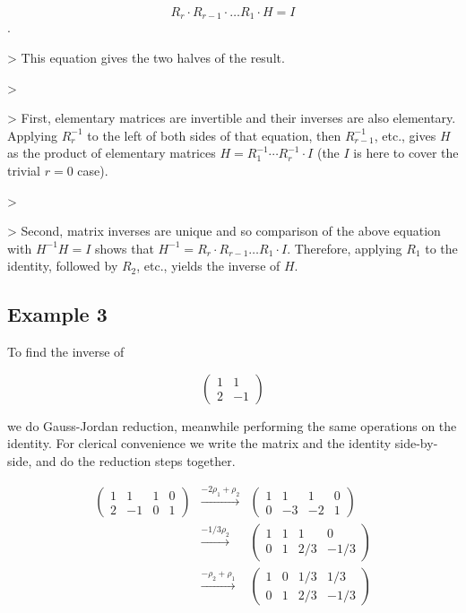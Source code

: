 $$R _{r}\cdot R _{r-1}\cdot\dots R _{1}\cdot H=I$$.



> This equation gives the two halves of the result.

>

> First, elementary matrices are invertible and their inverses are also elementary.
Applying $R _r^{-1}$ to the left of both sides of that equation, then $R _{r-1}^{-1}$,
etc., gives $H$ as the product of elementary matrices $H=R _1^{-1}\cdots R _r^{-1}\cdot I$
(the $I$ is here to cover the trivial $r=0$ case).

>

> Second, matrix inverses are unique and so comparison of the above equation with
$H^{-1}H=I$ shows that $H^{-1}=R _r\cdot R _{r-1}\dots R _1\cdot I$. Therefore, applying
$R _1$ to the identity, followed by $R _2$, etc., yields the inverse of $H$.




\subsection{Example 3}
\label{sss:exam-ad87}




To find the inverse of



$$\begin{pmatrix} 1  & 1  \\ 2  & -1 \end{pmatrix}$$



we do Gauss-Jordan reduction, meanwhile performing the same operations on the identity.
For clerical convenience we write the matrix and the identity side-by-side, and do the
reduction steps together.



$$\begin{array}{rcl} \left(\begin{array}{cc|cc} 1  & 1   & 1  & 0  \\ 2  & -1  & 0  & 1 \end{array}\right) &\xrightarrow[]{-2\rho _1+\rho _2} &\left(\begin{array}{cc|cc} 1  & 1   & 1  & 0  \\ 0  & -3  & -2 & 1 \end{array}\right) \\ &\xrightarrow[]{-1/3\rho _2} &\left(\begin{array}{cc|cc} 1  & 1   & 1   & 0     \\ 0  & 1   & 2/3 & -1/3 \end{array}\right)  \\ &\xrightarrow[]{-\rho _2+\rho _1} &\left(\begin{array}{cc|cc} 1  & 0   & 1/3 & 1/3  \\ 0  & 1   & 2/3 & -1/3 \end{array}\right) \end{array}$$



